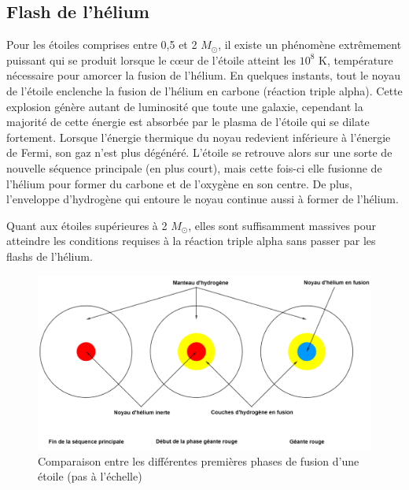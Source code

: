 \subsection{Flash de l'hélium}\label{2.2.1}

Pour les étoiles comprises entre 0,5 et 2 $M_\odot$, il existe un phénomène extrêmement puissant qui se produit lorsque le cœur de l’étoile atteint les $10^{8}$ K, température nécessaire pour amorcer la fusion de l’hélium. En quelques instants, tout le noyau de l’étoile enclenche la fusion de l’hélium en carbone (réaction triple alpha). Cette explosion génère autant de luminosité que toute une galaxie, cependant la majorité de cette énergie est absorbée par le plasma de l’étoile qui se dilate fortement. Lorsque l’énergie thermique du noyau redevient inférieure à l’énergie de Fermi, son gaz n’est plus dégénéré. L’étoile se retrouve alors sur une sorte de nouvelle séquence principale (en plus court), mais cette fois-ci elle fusionne de l’hélium pour former du carbone et de l’oxygène en son centre. De plus, l’enveloppe d’hydrogène qui entoure le noyau continue aussi à former de l’hélium.\smallskip

Quant aux étoiles supérieures à 2 $M_\odot$, elles sont suffisamment massives pour atteindre les conditions requises à la réaction triple alpha sans passer par les flashs de l’hélium.\newpage

\begin{figure}[H]\vspace{1cm}
	\centering
	\includegraphics[scale=0.38]{images/compo_sp_gr}
	\caption[Comparaison entre les différentes premières phases de fusion d'une étoile (pas à l'échelle) - figure réalisée avec GeoGebra]{Comparaison entre les différentes premières phases de fusion d'une étoile (pas à l'échelle)}
	\label{Fig. 2.4}
\end{figure}


